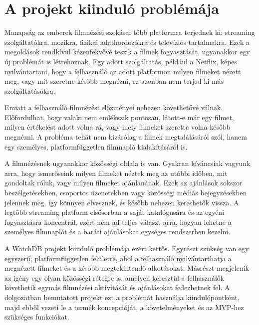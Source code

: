 \section{A projekt kiinduló problémája}
Manapság az emberek filmnézési szokásai több platformra terjednek ki: streaming szolgáltatókra, mozikra, fizikai adathordozókra és televíziós tartalmakra. Ezek a megoldások rendkívül kézenfekvővé teszik a filmek fogyasztását, ugyanakkor egy új problémát is létrehoznak. Egy adott szolgáltatás, például a Netflix, képes nyilvántartani, hogy a felhasználó az adott platformon milyen filmeket nézett meg, vagy mit szeretne később megnézni, ez azonban nem terjed ki más szolgáltatásokra.

Emiatt a felhasználó filmnézési előzményei nehezen követhetővé válnak. Előfordulhat, hogy valaki nem emlékszik pontosan, látott-e már egy filmet, milyen értékelést adott volna rá, vagy mely filmeket szerette volna később megnézni. A probléma tehát nem kizárólag a filmek megtalálásáról szól, hanem egy személyes, platformfüggetlen filmnapló kialakításáról is.

A filmnézésnek ugyanakkor közösségi oldala is van. Gyakran kíváncsiak vagyunk arra, hogy ismerőseink milyen filmeket néztek meg az utóbbi időben, mit gondoltak róluk, vagy milyen filmeket ajánlanának. Ezek az ajánlások sokszor beszélgetésekben, csoportos üzenetekben vagy közösségi médiás bejegyzésekben jelennek meg, így könnyen elvesznek, és később nehezen kereshetők vissza. A legtöbb streaming platform elsősorban a saját katalógusára és az egyéni fogyasztásra koncentrál, ezért nem ad teljes választ arra, hogyan lehetne a személyes filmnaplót és a baráti ajánlásokat egységes rendszerben kezelni.

A WatchDB projekt kiinduló problémája ezért kettős. Egyrészt szükség van egy egyszerű, platformfüggetlen felületre, ahol a felhasználó nyilvántarthatja a megnézett filmeket és a később megtekintendő alkotásokat. Másrészt megjelenik az igény egy olyan közösségi rétegre is, amelyen keresztül a felhasználók követhetik egymás filmnézési aktivitását és ajánlásokat fedezhetnek fel. A dolgozatban bemutatott projekt ezt a problémát használja kiindulópontként, majd ebből vezeti le a termék koncepcióját, a követelményeket és az MVP-hez szükséges funkciókat.
